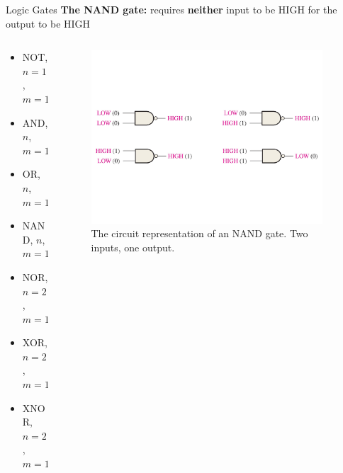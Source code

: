 \documentclass{beamer}
\begin{document}
\begin{frame}{Logic Gates}
\textbf{The NAND gate:} requires \textbf{neither} input to be HIGH for the output to be HIGH \\ \vspace{0.5cm}
\begin{columns}[T]
\begin{column}{0.5\textwidth}
\begin{itemize}
\item \alert{NOT, $n=1$, $m=1$}
\item \alert{AND, $n$, $m=1$}
\item \alert{OR, $n$, $m=1$}
\item \alert{NAND, $n$, $m=1$}
\item NOR, $n=2$, $m=1$
\item XOR, $n=2$, $m=1$
\item XNOR, $n=2$, $m=1$
\end{itemize}
\end{column}
\begin{column}{0.5\textwidth}
\begin{figure}
\centering
\includegraphics[width=0.95\textwidth,trim=0cm 6cm 0cm 6cm,clip=true]{figures/BasicNAND.pdf}
\caption{\label{fig:nand} The circuit representation of an NAND gate.  Two inputs, one output.}
\end{figure}
\end{column}
\end{columns}
\end{frame}
\end{document}
